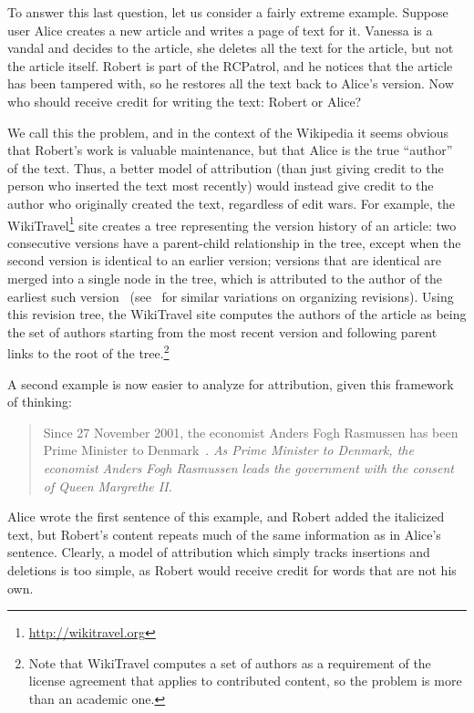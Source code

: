To answer this last question, let us consider a fairly extreme example.
Suppose user Alice creates a new article and writes a page of text for it.
Vanessa is a vandal and decides to  the article,
\ie she deletes all the text for the article, but not the article itself.
Robert is part of the RCPatrol, and he notices that the article has
been tampered with, so he restores all the text back to Alice's version.
Now who should receive credit for writing the text: Robert or Alice?

We call this the  problem,
and in the context of the Wikipedia it seems obvious that Robert's
work is valuable maintenance, but that Alice is the true ``author'' of the text.
Thus, a better model of attribution (than just giving credit
to the person who inserted the text most recently) would instead give credit
to the author who originally created the text,
regardless of edit wars.
For example, the WikiTravel\footnote{\url{http://wikitravel.org}}
site creates a tree representing
the version history of an article: two consecutive versions
have a parent-child relationship in the tree, except when
the second version is identical to an earlier version;
versions that are identical are merged into a single node
in the tree, which is attributed to the author of the earliest
such version~\cite{WikiTravelAuthorship}
(see~\cite{Ekstrand2009,Sabel2007} for similar variations
on organizing revisions).
Using this revision tree, the WikiTravel site computes the
authors of the article as being the set of authors starting
from the most recent version and following parent links
to the root of the tree.\footnote{Note that WikiTravel
computes a set of authors as a requirement
of the license agreement that applies to contributed content,
so the problem is more than an academic one.}


A second example is now easier to analyze for attribution,
given this framework of thinking:
%
\begin{quote}
Since 27 November 2001, the economist Anders Fogh Rasmussen
has been Prime Minister to Denmark~\cite{wiki:Denmark-Fogh}.
\textit{As Prime Minister to Denmark, the economist Anders Fogh Rasmussen
leads the government with the consent of Queen Margrethe II.}
\end{quote}
%
Alice wrote the first sentence of this example, and Robert
added the italicized text,
but Robert's content repeats much of the same information as
in Alice's sentence.
Clearly, a model of attribution which simply tracks insertions
and deletions is too simple, as Robert
would receive credit for words that are not his own.


